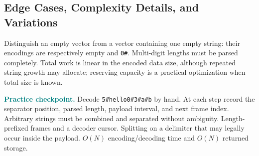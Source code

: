 \subsection{Edge Cases, Complexity Details, and Variations}
Distinguish an empty vector from a vector containing one empty string: their
encodings are respectively empty and \texttt{0\#}. Multi-digit lengths must
be parsed completely. Total work is linear in the encoded data size, although
repeated string growth may allocate; reserving capacity is a practical
optimization when total size is known.

\medskip
\noindent\textcolor{teal}{\textbf{Practice checkpoint.}}
Decode \texttt{5\#hello0\#3\#a\#b} by hand. At each step record the separator
position, parsed length, payload interval, and next frame index.
\chaptercheckpoint
  {Arbitrary strings must be combined and separated without ambiguity.}
  {Length-prefixed frames and a decoder cursor.}
  {Splitting on a delimiter that may legally occur inside the payload.}
  {$O(N)$ encoding/decoding time and $O(N)$ returned storage.}
\judgeclassnote